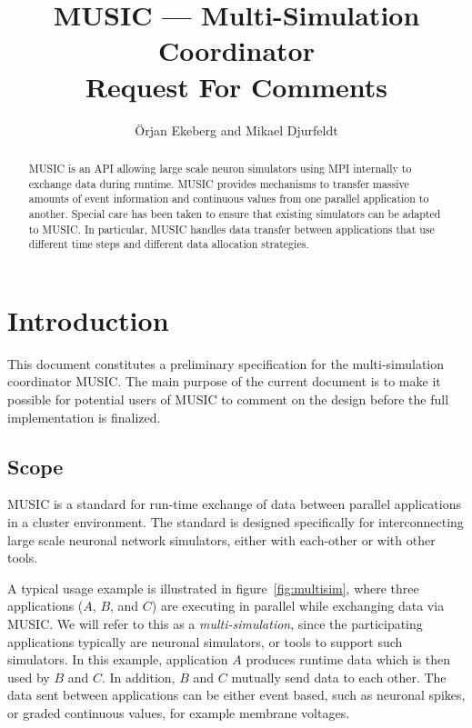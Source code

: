 \documentclass[a4paper,twoside]{report}
\begin{document}
\lstset{language=C++,identifierstyle=\ttfamily}

\title{MUSIC --- Multi-Simulation Coordinator\\[2ex]
  Request For Comments\\}

\author{Örjan Ekeberg and Mikael Djurfeldt}

\maketitle

\begin{abstract}
  MUSIC is an API allowing large scale neuron simulators using MPI
  internally to exchange data during runtime.  MUSIC provides
  mechanisms to transfer massive amounts of event information and
  continuous values from one parallel application to another.  Special
  care has been taken to ensure that existing simulators can be
  adapted to MUSIC.  In particular, MUSIC handles data transfer
  between applications that use different time steps and different
  data allocation strategies.
\end{abstract}


\tableofcontents

\listoffigures

\chapter{Introduction}

This document constitutes a preliminary specification for the
multi-simulation coordinator MUSIC.  The main purpose of the current
document is to make it possible for potential users of MUSIC to
comment on the design before the full implementation is finalized.

\section{Scope}

MUSIC is a standard for run-time exchange of data between parallel
applications in a cluster environment.  The standard is designed
specifically for interconnecting large scale neuronal network
simulators, either with each-other or with other tools.

A typical usage example is illustrated in figure~\ref{fig:multisim},
where three applications ($A$, $B$, and $C$) are executing in parallel
while exchanging data via MUSIC.  We will refer to this as a
\emph{multi-simulation}, since the participating applications
typically are neuronal simulators, or tools to support such
simulators.  In this example, application $A$ produces runtime data
which is then used by $B$ and $C$.  In addition, $B$ and $C$ mutually
send data to each other.  The data sent between applications can be
either event based, such as neuronal spikes, or graded continuous
values, for example membrane voltages.
\end{document}
